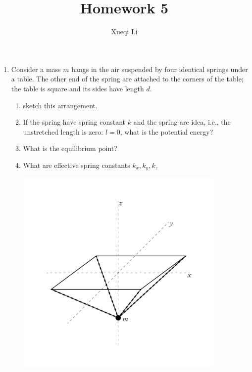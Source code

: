 \documentclass{article}
\begin{document}
\title{Homework 5}
\author{Xueqi Li}


\maketitle

\begin{enumerate}
    \item Consider a mass $m$ hangs in the air suspended by four identical springs under a table. The other end of the spring are attached to the corners of the table; the table is square and its sides have length $d$.
    \begin{enumerate}
        \item sketch this arrangement.
        \item If the spring have spring constant $k$ and the spring are idea, i.e., the unstretched length is zero: $l = 0$, what is the potential energy?
        \item What is the equilibrium point?
        \item What are effective spring constants $k_x, k_y, k_z$

        \begin{center}
            \includegraphics[height=4in]{plot.pdf}
        \end{center}



\end{enumerate}
\end{enumerate}
\end{document}

